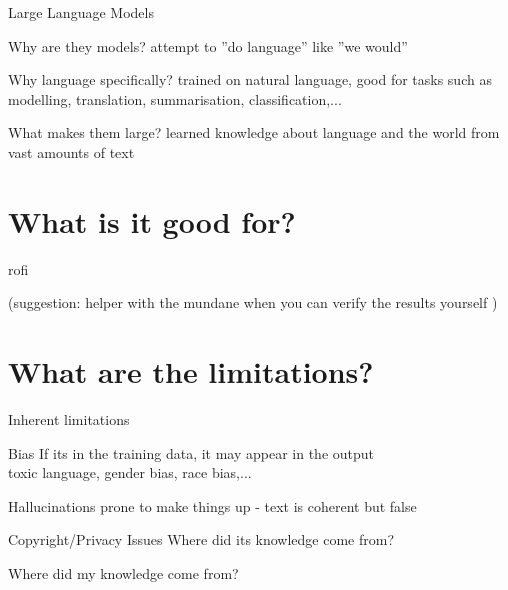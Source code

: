 \documentclass[aspectratio=169,hyperref={unicode}]{beamer}
\begin{document}
\begin{frame}{Large Language Models}
\begin{alertblock}{Why are they models?}
attempt to ''do language'' like ''we would''
\end{alertblock}

\begin{alertblock}{Why language specifically?}
trained on natural language, good for tasks such as modelling, translation, summarisation, classification,...
\end{alertblock}

\begin{alertblock}{What makes them large?}
learned knowledge about language and the world from vast amounts of text
\end{alertblock}

\end{frame}

\section{What is it good for?}

\begin{frame}
	rofi
	
	(suggestion: helper with the mundane when you can verify the results yourself )
\end{frame}

\section{What are the limitations?}

\begin{frame}{Inherent limitations}
\begin{alertblock}{Bias}
If its in the training data, it may appear in the output\\
toxic language, gender bias, race bias,...
\end{alertblock}

\begin{alertblock}{Hallucinations}
prone to make things up - text is coherent but false	
\end{alertblock}

\begin{alertblock}{Copyright/Privacy Issues}
Where did its knowledge come from?

Where did my knowledge come from?
	
\end{alertblock}

\end{frame}
\end{document}
